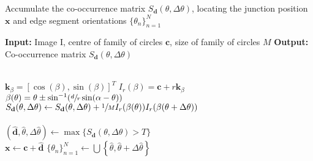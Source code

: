 \begin{algorithm}[t]
\caption{Accumulate the co-occurrence matrix $S_\mathbf{d}(\theta, \Delta \theta)$, locating the junction position $\mathbf{x}$ and edge segment orientations $\{\theta_n\}_{n = 1}^N$ \label{Alg:1}}
\label{Alg:Accumulation}
\begin{algorithmic}
\State \textbf{Input:} Image I, centre of family of circles $\mathbf{c}$, size of family of circles $M$
\State \textbf{Output:} Co-occurrence matrix $S_{\mathbf{d}}(\theta, \Delta \theta)$\\



        \\

            \State $\mathbf{k}_{\beta} = [\cos(\beta), \sin(\beta)]^T$
            \State $I_r(\beta) = \mathbf{c} + r\mathbf{k}_{\beta}$\\

            \State $\beta(\theta) = \theta \pm \sin^{-1}(\sfrac{d}{r}\sin(\alpha - \theta))$\\

            \State $S_{\mathbf{d}}(\theta, \Delta \theta) \gets S_{\mathbf{d}}(\theta, \Delta \theta) + \sfrac{1}{M}I_r(\beta(\theta))I_r(\beta(\theta + \Delta \theta))$\\
        \EndFor
    \EndFor
\EndFor\\

\State $(\hat{\mathbf{d}}, \hat{\theta}, \Delta \hat{\theta}) \gets \max\{S_{\mathbf{d}}(\theta, \Delta \theta)> T\}$\\
\State $\mathbf{x} \gets \mathbf{c} + \hat{\mathbf{d}}$
\State $\{\theta_n\}_{n = 1}^{N} \gets \bigcup\left\{\hat{\theta}, \hat{\theta} + \Delta \hat{\theta}\right\}$
\end{algorithmic}
\end{algorithm}
